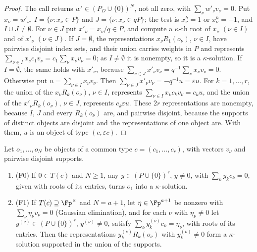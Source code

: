 \begin{proof}
The call returns $w' \in (P_D\cup\{0\})^N$, not all zero, with $\sum_\nu w'_\nu v_\nu = 0$. Put $x_\nu = w'_\nu$, $I = \{\nu : x_\nu \in P\}$ and $J = \{\nu : x_\nu \in qP\}$; the test is $x_\nu^h = 1$ or $x_\nu^h = -1$, and $I \cup J \ne \emptyset$. For $\nu \in J$ put $x'_\nu = x_\nu/q \in P$, and compute a $\kappa$-th root of $x_\nu$ $(\nu \in I)$ and of $x'_\nu$ $(\nu \in J)$.
If $J = \emptyset$, the representations $x_\nu R_1(o_\nu)$, $\nu \in I$, have pairwise disjoint index sets, and their union carries weights in $P$ and represents $\sum_{\nu\in I}x_\nu c_1v_\nu = c_1\sum_\nu x_\nu v_\nu = 0$; as $I \ne \emptyset$ it is nonempty, so it is a $\kappa$-solution. If $I = \emptyset$, the same holds with $x'_\nu$, because $\sum_{\nu\in J}x'_\nu v_\nu = q^{-1}\sum_\nu x_\nu v_\nu = 0$.
Otherwise put $u = \sum_{\nu\in I}x_\nu v_\nu$. Then $\sum_{\nu\in J}x'_\nu v_\nu = -q^{-1}u = \varepsilon u$. For $k = 1,\dots,r$, the union of the $x_\nu R_k(o_\nu)$, $\nu \in I$, represents $\sum_{\nu\in I}x_\nu c_kv_\nu = c_ku$, and the union of the $x'_\nu R_k(o_\nu)$, $\nu \in J$, represents $c_k\varepsilon u$. These $2r$ representations are nonempty, because $I$, $J$ and every $R_k(o_\nu)$ are, and pairwise disjoint, because the supports of distinct objects are disjoint and the representations of one object are. With them, $u$ is an object of type $(c,\varepsilon c)$.
\end{proof}

\begin{lemma}[Finish]
\label{lem:finish}
Let $o_1,\dots,o_N$ be objects of a common type $c = (c_1,\dots,c_r)$, with vectors $v_\nu$ and pairwise disjoint supports.
\begin{enumerate}[label=\textup{(\roman*)},leftmargin=2em]
  \item \textup{(F0)} If $0 \in T(c)$ and $N \ge 1$, any $y \in (P\cup\{0\})^r$, $y \ne 0$, with $\sum_ky_kc_k = 0$, given with roots of its entries, turns $o_1$ into a $\kappa$-solution.
  \item \textup{(F1)} If $T(c) \supseteq \Fp^\times$ and $N = a+1$, let $\eta \in \Fp^{a+1}$ be nonzero with $\sum_\nu\eta_\nu v_\nu = 0$ (Gaussian elimination), and for each $\nu$ with $\eta_\nu \ne 0$ let $y^{(\nu)} \in (P\cup\{0\})^r$, $y^{(\nu)} \ne 0$, satisfy $\sum_ky^{(\nu)}_kc_k = \eta_\nu$, with roots of its entries. Then the representations $y^{(\nu)}_kR_k(o_\nu)$ with $y^{(\nu)}_k \ne 0$ form a $\kappa$-solution supported in the union of the supports.
\end{enumerate}
\end{lemma}

